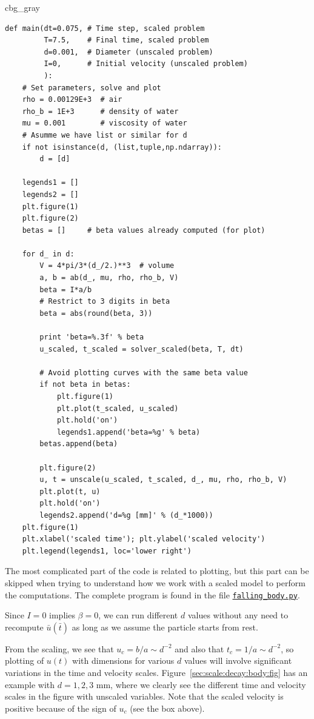 \documentclass[graybox,envcountchap,sectrefs,final]{svmonodo}
\newenvironment{_cod_tight}[1]{
   \def\FrameCommand{\colorbox{#1}}
   \FrameRule0.6pt\MakeFramed {\FrameRestore}\vskip3mm}
   {\vskip0mm\endMakeFramed}
\newenvironment{cod}[1]{
\bgroup\rmfamily
\fboxsep=0mm\relax
\begin{_cod_tight}{#1}
\list{}{\parsep=-2mm\parskip=0mm\topsep=0pt\leftmargin=2mm
\rightmargin=2\leftmargin\leftmargin=4pt\relax}
\item\relax}
{\endlist\end{_cod_tight}\egroup}
\begin{document}
\begin{cod}{cbg_gray}\begin{Verbatim}[numbers=none,fontsize=\fontsize{9pt}{9pt},baselinestretch=0.95,xleftmargin=2mm]
def main(dt=0.075, # Time step, scaled problem
         T=7.5,    # Final time, scaled problem
         d=0.001,  # Diameter (unscaled problem)
         I=0,      # Initial velocity (unscaled problem)
         ):
    # Set parameters, solve and plot
    rho = 0.00129E+3  # air
    rho_b = 1E+3      # density of water
    mu = 0.001        # viscosity of water
    # Asumme we have list or similar for d
    if not isinstance(d, (list,tuple,np.ndarray)):
        d = [d]

    legends1 = []
    legends2 = []
    plt.figure(1)
    plt.figure(2)
    betas = []     # beta values already computed (for plot)

    for d_ in d:
        V = 4*pi/3*(d_/2.)**3  # volume
        a, b = ab(d_, mu, rho, rho_b, V)
        beta = I*a/b
        # Restrict to 3 digits in beta
        beta = abs(round(beta, 3))

        print 'beta=%.3f' % beta
        u_scaled, t_scaled = solver_scaled(beta, T, dt)

        # Avoid plotting curves with the same beta value
        if not beta in betas:
            plt.figure(1)
            plt.plot(t_scaled, u_scaled)
            plt.hold('on')
            legends1.append('beta=%g' % beta)
        betas.append(beta)

        plt.figure(2)
        u, t = unscale(u_scaled, t_scaled, d_, mu, rho, rho_b, V)
        plt.plot(t, u)
        plt.hold('on')
        legends2.append('d=%g [mm]' % (d_*1000))
    plt.figure(1)
    plt.xlabel('scaled time'); plt.ylabel('scaled velocity')
    plt.legend(legends1, loc='lower right')
\end{Verbatim}
\end{cod}
\noindent
The most complicated part of the code is related to plotting, but
this part can be skipped when trying to understand how we work with
a scaled model to perform the computations.
The complete program is found in the file
\href{{http://tinyurl.com/o8pb3yy/falling_body.py}}{\nolinkurl{falling_body.py}}.

Since $I=0$ implies $\beta=0$, we can run different $d$ values without
any need to recompute $\bar u(\bar t)$ as long as we assume the particle
starts from rest.

From the scaling, we see that $u_c = b/a\sim d^{-2}$ and
also that $t_c=1/a \sim d^{-2}$, so plotting of $u(t)$ with dimensions
for various $d$ values will involve significant variations in the time
and velocity scales. Figure~\ref{sec:scale:decay:body:fig}
has an example with $d=1,2,3$ mm, where we clearly see the different
time and velocity scales in the figure with unscaled variables.
Note that the scaled velocity is positive because of the sign of $u_c$
(see the box above).
\end{document}
